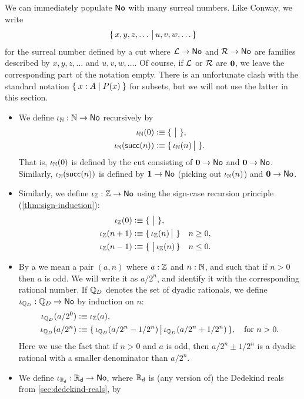 We can immediately populate $\mathsf{No}$ with many surreal numbers.
Like Conway, we write
\[\{\,x,y,z,\dots\,\big|\,u,v,w,\dots\,\}\]
for the surreal number defined by a cut where $\mathcal{L}\to\mathsf{No}$ and $\mathcal{R}\to\mathsf{No}$ are families described by $x,y,z,\dots$ and $u,v,w,\dots$.
Of course, if $\mathcal{L}$ or $\mathcal{R}$ are $\mathbf{0}$, we leave the corresponding part of the notation empty.
There is an unfortunate clash with the standard notation $\Set{x:A | P(x)}$ for subsets, but we will not use the latter in this section.
\begin{itemize}
\item We define $\iota_{\mathbb{N}}:\mathbb{N}\to\mathsf{No}$ recursively by
  \begin{align*}
    \iota_{\mathbb{N}}(0) &\vcentcolon\equiv \{\,\,\big|\,\,\},\\
    \iota_\mathbb{N}(\mathsf{succ}(n)) &\vcentcolon\equiv \{\,\iota_\mathbb{N}(n)\,\big|\,\,\}.
  \end{align*}
  That is, $\iota_\mathbb{N}(0)$ is defined by the cut consisting of $\mathbf{0}\to\mathsf{No}$ and $\mathbf{0}\to\mathsf{No}$.
  Similarly, $\iota_\mathbb{N}(\mathsf{succ}(n))$ is defined by $\mathbf{1}\to\mathsf{No}$ (picking out $\iota_\mathbb{N}(n)$) and $\mathbf{0}\to\mathsf{No}$.
\item Similarly, we define $\iota_{\mathbb{Z}}:\mathbb{Z}\to\mathsf{No}$ using the sign-case recursion principle (\cref{thm:sign-induction}):
  \begin{align*}
    \iota_{\mathbb{Z}}(0) &\vcentcolon\equiv \{\,\,\big|\,\,\},\\
    \iota_\mathbb{Z}(n+1) &\vcentcolon\equiv \{\,\iota_\mathbb{Z}(n)\,\big|\,\,\} & &\text{$n\ge 0$,}\\
    \iota_\mathbb{Z}(n-1) &\vcentcolon\equiv \{\,\,\big|\,\iota_\mathbb{Z}(n)\,\} & &\text{$n\le 0$.}
  \end{align*}
\item By a 
  we mean a pair $(a,n)$ where $a:\mathbb{Z}$ and $n:\mathbb{N}$, and such that if $n>0$ then $a$ is odd.
  We will write it as $a/2^n$, and identify it with the corresponding rational number.
  If $\mathbb{Q}_D$ denotes the set of dyadic rationals, we define $\iota_{\mathbb{Q}_D}:\mathbb{Q}_D\to\mathsf{No}$ by induction on $n$:
  \begin{align*}
    \iota_{\mathbb{Q}_D}(a/2^0) &\vcentcolon\equiv \iota_\mathbb{Z}(a),\\
    \iota_{\mathbb{Q}_D}(a/2^n) &\vcentcolon\equiv \{\,\iota_{\mathbb{Q}_D}(a/2^n - 1/2^n)\,\big|\,\iota_{\mathbb{Q}_D}(a/2^n + 1/2^n)\,\},
    \quad \text{for $n>0$.}
  \end{align*}
  Here we use the fact that if $n>0$ and $a$ is odd, then $a/2^n \pm 1/2^n$ is a dyadic rational with a smaller denominator than $a/2^n$.
\item We define $\iota_{\mathbb{R}_\mathsf{d}}:\mathbb{R}_\mathsf{d}\to\mathsf{No}$,\label{reals-into-surreals} where $\mathbb{R}_\mathsf{d}$ is (any version of) the Dedekind reals from \cref{sec:dedekind-reals}, by

\end{itemize}
